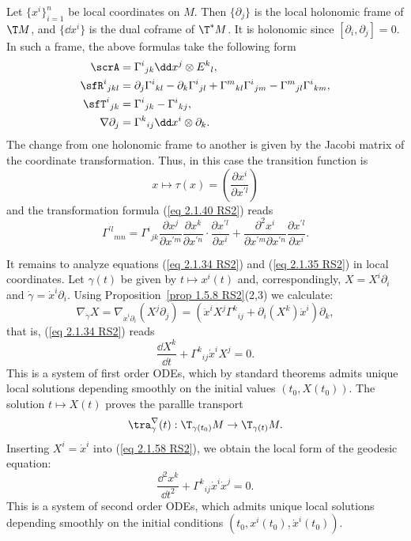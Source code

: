 \begin{rem}\label{rem 2.1.29 RS2}
    Let $\{x^i\}_{i=1}^n$ be local coordinates on $M$. Then $\{\partial_j\}$ is the local holonomic frame of $\T M$, and $\{\dd x^i\}$ is the dual coframe of $\T^\ast M$. It is holonomic since $[\partial_i,\partial_j]=0$. In such a frame, the above formulas take the following form 
    \begin{align}
        \scrA&=\Gamma^i{}_{jk}\dd x^j\otimes E^k{}_l,\\
        \sfR^i{}_{jkl}&=\partial_j\Gamma^i{}_{kl}-\partial_k\Gamma^i{}_{jl}+\Gamma^m{}_{kl}\Gamma^i{}_{jm}-\Gamma^m{}_{jl}\Gamma^i{}_{km},\\
        \sfT^i{}_{jk}&=\Gamma^i{}_{jk}-\Gamma^i{}_{kj},\\
        \nabla\partial_j&=\Gamma^k{}_{ij}\dd x^i\otimes\partial_k.
    \end{align}
    The change from one holonomic frame to another is given by the Jacobi matrix of the coordinate transformation. Thus, in this case the transition function is 
    \[x\mapsto \tau(x)=\left(\frac{\partial x^i}{\partial x^{\prime l}}\right)\]
    and the transformation formula (\ref{eq 2.1.40 RS2}) reads 
    \[\Gamma^{\prime l}{}_{mn}=
    \Gamma^i{}_{jk}\frac{\partial x^j}{\partial x^{\prime m}}  \frac{\partial x^k}{\partial x^{\prime n}}\cdot \frac{\partial x^{\prime l}}{\partial x^i}+
    \frac{\partial^2 x^i}{\partial x^{\prime m}\partial x^{\prime n}}\frac{\partial x^{\prime l}}{\partial x^i}.
    \]
\end{rem}


It remains to analyze equations (\ref{eq 2.1.34 RS2}) and (\ref{eq 2.1.35 RS2}) in local coordinates. Let $\gamma(t)$ be given by $t\mapsto x^i(t)$ and, correspondingly, $X=X^i\partial_i$ and $\dot\gamma=\dot x^i\partial_i$. Using Proposition~\ref{prop 1.5.8 RS2}(2,3) we calculate:
\[\nabla_{\dot\gamma}X=\nabla_{\dot x^i\partial_i}(X^j\partial_j)=(\dot x^iX^j\Gamma^k{}_{ij}+\partial_i(X^k)\dot x^i)\partial_k,\]
that is, (\ref{eq 2.1.34 RS2}) reads 
\[\frac{\dd X^k}{\dd t}+\Gamma^k{}_{ij}\dot x^i X^j=0.\label{eq 2.1.58 RS2}\]
This is a system of first order ODEs, which by standard theorems admits unique local solutions depending smoothly on the initial values $(t_0,X(t_0))$. The solution $t\mapsto X(t)$ proves the parallle transport 
\[\tra_{\gamma}^{\nabla}(t):\T_{\gamma(t_0)}M\to \T_{\gamma(t)}M.\]
Inserting $X^i=\dot x^i$ into (\ref{eq 2.1.58 RS2}), we obtain the local form of the geodesic equation:
\[\frac{\dd^2 x^k}{\dd t^2}+\Gamma^k{}_{ij}\dot x^i\dot x^j=0.\]
This is a system of second order ODEs, which admits unique local solutions depending smoothly on the initial conditions $(t_0,x^i(t_0),\dot x^i(t_0))$.

